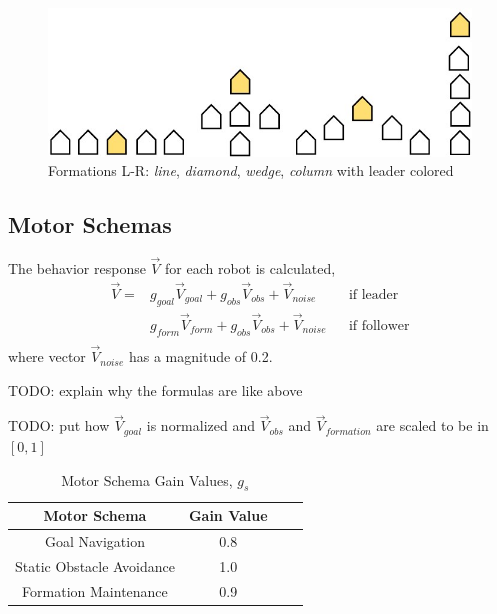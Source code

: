 \documentclass[letterpaper, 10 pt, conference]{ieeeconf}  %
\begin{document}
\begin{figure}[thpb]
\centering
\includegraphics[width=0.7\linewidth]{images/formation_shapes.jpg}
\caption{Formations L-R: \textit{line}, \textit{diamond}, \textit{wedge}, \textit{column} with leader colored}
\label{formation_shapes}
\end{figure}

\subsection{Motor Schemas}

The behavior response $\vec{V}$ for each robot is calculated,
\begin{equation*}
\begin{aligned}
\vec{V} = & g_{goal} \vec{V}_{goal} + g_{obs} \vec{V}_{obs} + \vec{V}_{noise}        && \text{if leader}\\
              & g_{form} \vec{V}_{form} + g_{obs} \vec{V}_{obs} + \vec{V}_{noise}       && \text{if follower}\\
\end{aligned}
\end{equation*}
where vector $\vec{V}_{noise}$ has a magnitude of 0.2. 

TODO: explain why the formulas are like above

TODO: put how $\vec{V}_{goal}$ is normalized and $\vec{V}_{obs}$ and $\vec{V}_{formation}$ are scaled to be in $[0,1]$

\begin{table}[h]
\begin{center}
\begin{tabular}{|c|c|c c|}
\hline
Motor Schema & Gain Value \\
\hline
Goal Navigation                & 0.8 \\
Static Obstacle Avoidance   & 1.0 \\
Formation Maintenance      & 0.9 \\
\hline
\end{tabular}
\end{center}
\caption{Motor Schema Gain Values, $g_s$}
\label{table_example}
\end{table}
\end{document}

